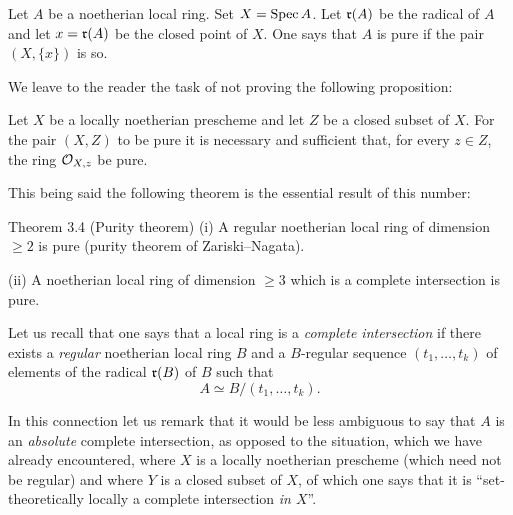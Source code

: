 \begin{definition} \label{X.3.2}
Let $A$ be a noetherian local ring. Set $X=\operatorname{Spec} A$. Let $\mathfrak{r}(A)$ be
the radical of $A$ and let $x=\mathfrak{r}(A)$ be the closed point of $X$. One
says that $A$ is pure if the pair $(X, \{x\})$ is so.
\end{definition}

We leave to the reader the task of not proving the following
proposition:

\begin{proposition} \label{X.3.3}
Let $X$ be a locally noetherian prescheme and let $Z$ be a closed
subset of $X$. For the pair $(X, Z)$ to be pure it is necessary and
sufficient that, for every $z\in Z$, the ring ${\mathcal O}_{X, z}$ be
pure.
\end{proposition}

This being said the following theorem is the essential result of this
number:

\label{X.3.4}
\begin{enonce*}{Theorem 3.4 (Purity theorem\ndemark)}
\textup{(i)}\enspace
A regular noetherian local ring of dimension $\geq 2$ is pure (purity
theorem of Zariski--Nagata).

\textup{(ii)}\enspace
A noetherian local ring of dimension $\geq 3$ which is a complete
intersection is pure.
\end{enonce*}

Let us recall that one says that a local ring is a \emph{complete
intersection} if there exists a \emph{regular} noetherian local ring
$B$ and a $B$-regular sequence $(t_1, \ldots, t_k)$ of elements of the
radical $\mathfrak{r}(B)$ of $B$ such that
\[
A \simeq B/(t_1, \ldots, t_k).
\]

In this connection let us remark that it would be less ambiguous to say
that $A$ is an \emph{absolute} complete intersection, as opposed to the
situation, which we have already encountered, where $X$ is a locally
noetherian prescheme (which need not be regular) and where $Y$ is a
closed subset of $X$, of which one says that it is ``set-theoretically
locally a complete intersection \emph{in $X$}''.

